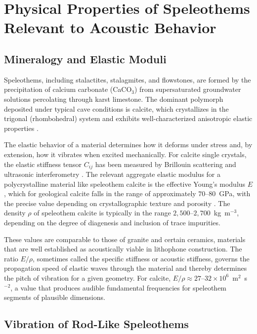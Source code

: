 \documentclass[12pt]{article}
\begin{document}
\section{Physical Properties of Speleothems Relevant to Acoustic Behavior}

\subsection{Mineralogy and Elastic Moduli}

Speleothems, including stalactites, stalagmites, and flowstones, are formed by the precipitation of calcium carbonate (CaCO$_3$) from supersaturated groundwater solutions percolating through karst limestone. The dominant polymorph deposited under typical cave conditions is calcite, which crystallizes in the trigonal (rhombohedral) system and exhibits well-characterized anisotropic elastic properties \citep{Birch1960, Bass1995}.

The elastic behavior of a material determines how it deforms under stress and, by extension, how it vibrates when excited mechanically. For calcite single crystals, the elastic stiffness tensor $C_{ij}$ has been measured by Brillouin scattering and ultrasonic interferometry \citep{Bass1995}. The relevant aggregate elastic modulus for a polycrystalline material like speleothem calcite is the effective Young's modulus $E$, which for geological calcite falls in the range of approximately $70$--$80$~GPa, with the precise value depending on crystallographic texture and porosity \citep{Mavko2009}. The density $\rho$ of speleothem calcite is typically in the range $2{,}500$--$2{,}700$~kg~m$^{-3}$, depending on the degree of diagenesis and inclusion of trace impurities.

These values are comparable to those of granite and certain ceramics, materials that are well established as acoustically viable in lithophone construction. The ratio $E/\rho$, sometimes called the specific stiffness or acoustic stiffness, governs the propagation speed of elastic waves through the material and thereby determines the pitch of vibration for a given geometry. For calcite, $E/\rho \approx 27$--$32 \times 10^6$~m$^2$~s$^{-2}$, a value that produces audible fundamental frequencies for speleothem segments of plausible dimensions.

\subsection{Vibration of Rod-Like Speleothems}
\end{document}
